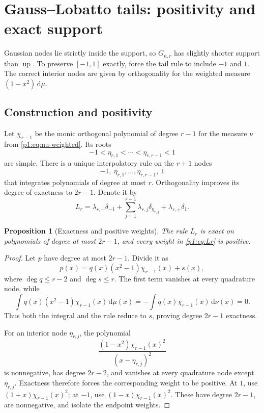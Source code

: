\documentclass[11pt]{article}
\numberwithin{equation}{section}
\newtheorem{proposition}[theorem]{Proposition}
\theoremstyle{definition}
\theoremstyle{remark}
\newcommand{\Up}{\operatorname{up}}
\newcommand{\dd}{\,\mathrm d}
\begin{document}
\section{Gauss--Lobatto tails: positivity and exact support}
\label{p1:sec:lobatto}

Gaussian nodes lie strictly inside the support, so $G_{n,r}$ has slightly shorter support than $\Up$.  To preserve $[-1,1]$ exactly, force the tail rule to include $-1$ and $1$.  The correct interior nodes are given by orthogonality for the weighted measure $(1-x^2)\dd\mu$.

\subsection{Construction and positivity}

Let $\chi_{r-1}$ be the monic orthogonal polynomial of degree $r-1$ for the measure $\nu$ from \eqref{p1:eq:nu-weighted}.  Its roots
\begin{equation}
 -1<\eta_{r,1}<\cdots<\eta_{r,r-1}<1
 \label{p1:eq:L-interior-nodes}
\end{equation}
are simple.  There is a unique interpolatory rule on the $r+1$ nodes
\begin{equation}
 -1,\ \eta_{r,1},\ldots,\eta_{r,r-1},\ 1
 \label{p1:eq:L-nodes}
\end{equation}
that integrates polynomials of degree at most $r$.  Orthogonality improves its degree of exactness to $2r-1$.  Denote it by
\begin{equation}
 L_r=\lambda_{r,-}\delta_{-1}
 +\sum_{j=1}^{r-1}\lambda_{r,j}\delta_{\eta_{r,j}}
 +\lambda_{r,+}\delta_1.
 \label{p1:eq:Lr}
\end{equation}

\begin{proposition}[Exactness and positive weights]
\label{p1:prop:L-exact-positive}
The rule $L_r$ is exact on polynomials of degree at most $2r-1$, and every weight in \eqref{p1:eq:Lr} is positive.
\end{proposition}

\begin{proof}
Let $p$ have degree at most $2r-1$.  Divide it as
\[
 p(x)=q(x)(x^2-1)\chi_{r-1}(x)+s(x),
 \]
where $\deg q\le r-2$ and $\deg s\le r$.  The first term vanishes at every quadrature node, while
\[
 \int q(x)(x^2-1)\chi_{r-1}(x)\dd\mu(x)
 =-\int q(x)\chi_{r-1}(x)\dd\nu(x)=0.
\]
Thus both the integral and the rule reduce to $s$, proving degree $2r-1$ exactness.

For an interior node $\eta_{r,j}$, the polynomial
\[
 \frac{(1-x^2)\chi_{r-1}(x)^2}{(x-\eta_{r,j})^2}
\]
is nonnegative, has degree $2r-2$, and vanishes at every quadrature node except $\eta_{r,j}$.  Exactness therefore forces the corresponding weight to be positive.  At $1$, use $(1+x)\chi_{r-1}(x)^2$; at $-1$, use $(1-x)\chi_{r-1}(x)^2$.  These have degree $2r-1$, are nonnegative, and isolate the endpoint weights.
\end{proof}
\end{document}
